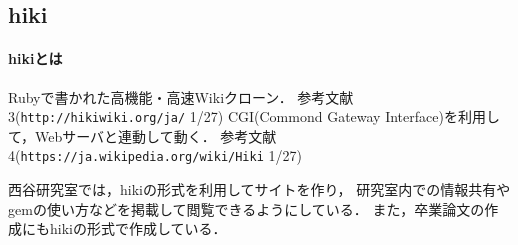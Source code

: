 \subsection{hiki}
\paragraph{hikiとは}
\begin{description}
\item Rubyで書かれた高機能・高速Wikiクローン．
参考文献3(\verb|http://hikiwiki.org/ja/| 1/27)
CGI(Commond Gateway Interface)を利用して，Webサーバと連動して動く．
参考文献4(\verb|https://ja.wikipedia.org/wiki/Hiki| 1/27)
\item 西谷研究室では，hikiの形式を利用してサイトを作り，
研究室内での情報共有やgemの使い方などを掲載して閲覧できるようにしている．
また，卒業論文の作成にもhikiの形式で作成している．
\end{description}